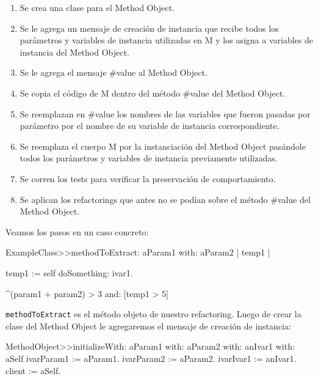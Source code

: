 \begin{enumerate}
    \item Se crea una clase para el Method Object.
    \item Se le agrega un mensaje de creación de instancia que recibe todos los
      parámetros y variables de instancia utilizadas en M y los asigna a
      variables de instancia del Method Object.
    \item Se le agrega el mensaje \#value al Method Object.
    \item Se copia el código de M dentro del método \#value del Method Object.
    \item Se reemplazan en \#value los nombres de las variables que fueron
      pasadas por parámetro por el nombre de su variable de instancia
      correspondiente.
    \item Se reemplaza el cuerpo M por la instanciación del Method Object
      pasándole todos los parámetros y variables de instancia previamente
      utilizadas.
    \item Se corren los tests para verificar la preservación de comportamiento.
    \item Se aplican los refactorings que antes no se podían sobre el método
      \#value del Method Object.
\end{enumerate}

Veamos los pasos en un caso concreto:

\begin{code}
ExampleClass>>methodToExtract: aParam1 with: aParam2 | temp1 |

    temp1 := self doSomething: ivar1.

    ^(param1 + param2) > 3 and: [temp1 > 5]
\end{code}

\lstinline{methodToExtract} es el método objeto de nuestro refactoring. Luego de
crear la clase del Method Object le agregaremos el mensaje de creación de
instancia:

\begin{code}
MethodObject>>initializeWith: aParam1 with: aParam2 with: anIvar1 with: aSelf
ivarParam1 := aParam1.  ivarParam2 := aParam2.  ivarIvar1 := anIvar1.  client :=
aSelf.
\end{code}

